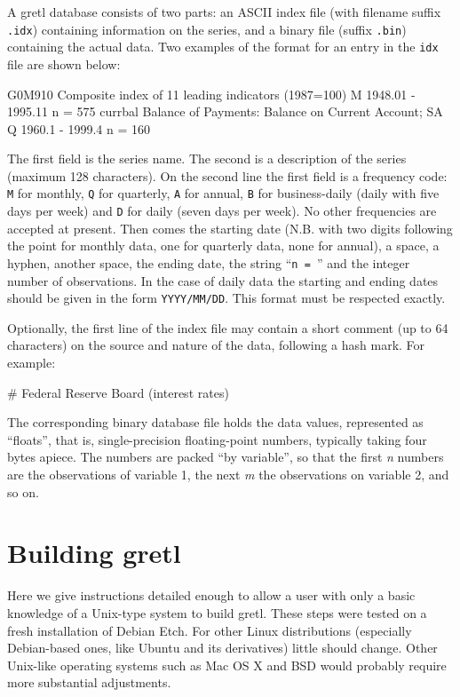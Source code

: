 A gretl database consists of two parts: an ASCII index file
(with filename suffix \verb+.idx+) containing information on the
series, and a binary file (suffix \verb+.bin+) containing the actual
data.  Two examples of the format for an entry in the \verb+idx+ file
are shown below:

\begin{code}
G0M910  Composite index of 11 leading indicators (1987=100) 
M 1948.01 - 1995.11  n = 575
currbal Balance of Payments: Balance on Current Account; SA 
Q 1960.1 - 1999.4 n = 160
\end{code}

The first field is the series name.  The second is a description of
the series (maximum 128 characters).  On the second line the first
field is a frequency code: \verb+M+ for monthly, \verb+Q+ for
quarterly, \verb+A+ for annual, \verb+B+ for business-daily (daily
with five days per week) and \verb+D+ for daily (seven days per week).
No other frequencies are accepted at present.  Then comes the starting
date (N.B. with two digits following the point for monthly data, one
for quarterly data, none for annual), a space, a hyphen, another
space, the ending date, the string ``\verb+n = +'' and the integer
number of observations. In the case of daily data the starting and
ending dates should be given in the form \verb+YYYY/MM/DD+. This
format must be respected exactly.

Optionally, the first line of the index file may contain a short
comment (up to 64 characters) on the source and nature of the data,
following a hash mark.  For example:

\begin{code}
# Federal Reserve Board (interest rates)
\end{code}

The corresponding binary database file holds the data values,
represented as ``floats'', that is, single-precision floating-point
numbers, typically taking four bytes apiece.  The numbers are packed
``by variable'', so that the first \emph{n} numbers are the
observations of variable 1, the next \emph{m} the observations on
variable 2, and so on.



\chapter{Building gretl}
\label{app-build}

Here we give instructions detailed enough to allow a user
with only a basic knowledge of a Unix-type system to build gretl.
These steps were tested on a fresh installation of Debian Etch. For
other Linux distributions (especially Debian-based ones, like Ubuntu
and its derivatives) little should change. Other Unix-like operating
systems such as Mac OS X and BSD would probably require more substantial
adjustments.

